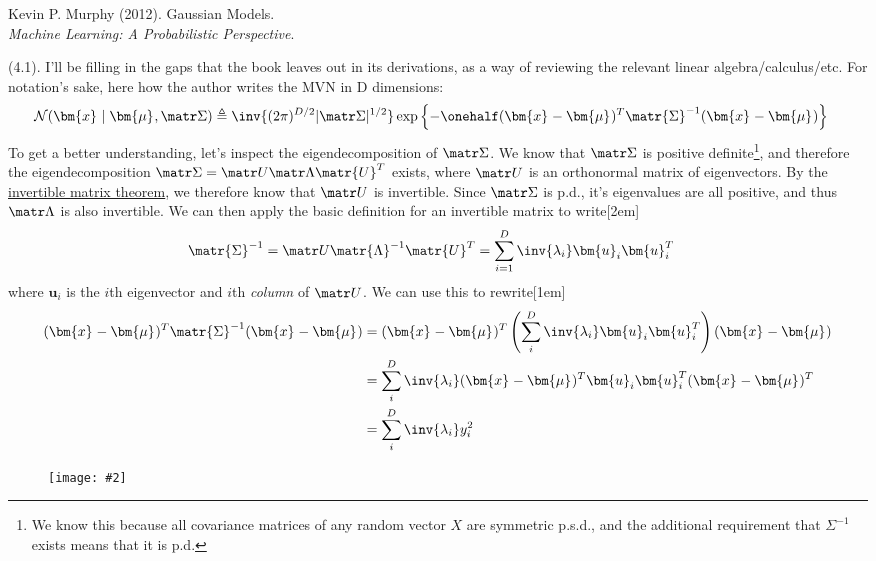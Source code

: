 \documentclass[11pt]{article}
\renewcommand\vec[2][]{\bm{#2}_{#1}}
\newcommand\myfig[2][0.3\textwidth]{\begin{figure}[h!]\centering\texttt{[image: \#2]}\end{figure}}
\newcommand\p{\Needspace{10\baselineskip} \noindent}
\begin{document}

\vspace{-1.7em}
{\scriptsize Kevin P. Murphy (2012). Gaussian Models.\\ \textit{Machine Learning: A Probabilistic Perspective}.\\ }

\newcommand{\minv}[1]{\matr{#1}^{-1}}
\p {} (4.1). I'll be filling in the gaps that the book leaves out in its derivations, as a way of reviewing the relevant linear algebra/calculus/etc. For notation's sake, here how the author writes the MVN in D dimensions:
\begin{align}
	\mathcal{N}(\vec x \mid \vec\mu, \matr\Sigma) 
		&\triangleq \inv{(2\pi)^{D/2} | \matr\Sigma |^{1/2}} \exp\left\{  -\onehalf (\vec x - \vec\mu)^T \matr{\Sigma}^{-1} (\vec x - \vec\mu)   \right\}
\end{align}
To get a better understanding, let's inspect the eigendecomposition of $\matr\Sigma$. We know that $\matr\Sigma$ is positive definite\footnote{We know this because all covariance matrices of any random vector $X$ are symmetric p.s.d., and the additional requirement that $\Sigma^{-1}$ exists means that it is p.d.}, and therefore the eigendecomposition $\matr\Sigma = \matr U \matr\Lambda \matr{U}^T$ exists, where $\matr U$ is an orthonormal matrix of eigenvectors. By the \href{https://www.wikiwand.com/en/Invertible_matrix#/Properties}{invertible matrix theorem}, we therefore know that $\matr U$ is invertible. Since $\matr\Sigma$ is p.d., it's eigenvalues are all positive, and thus $\matr\Lambda$ is also invertible. We can then apply the basic definition for an invertible matrix to write[2em]
\begin{align}
	\minv{\Sigma}
		&= \matr U \minv{\Lambda} \matr{U}^T = \sum_{i=1}^D \inv{\lambda_i} \vec[i]{u} \vec[i]{u}^T
\end{align}
where $\vec[i]{u}$ is the $i$th eigenvector and $i$th \textit{column} of $\matr U$. We can use this to rewrite[1em]
\begin{align}
	(\vec x - \vec\mu)^T \matr{\Sigma}^{-1} (\vec x - \vec\mu)
		&= (\vec x - \vec\mu)^T \left( \sum_i^D \inv{\lambda_i} \vec[i]{u} \vec[i]{u}^T  \right) (\vec x - \vec\mu)\\
		&= \sum_i^D \inv{\lambda_i} (\vec x - \vec\mu)^T  \vec[i]{u} \vec[i]{u}^T (\vec x - \vec\mu)^T \\
		&= \sum_i^D \inv{\lambda_i} y_i^2
\end{align}
\myfig[0.5\textwidth]{figs/gauss_ellipse.png}
\end{document}
